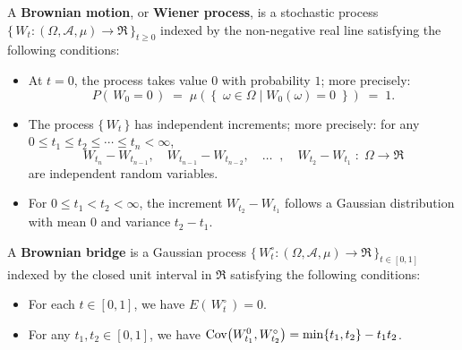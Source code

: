 \begin{definition}
\mbox{}\vskip 0.1cm
\noindent
A \textbf{Brownian motion}, or \textbf{Wiener process}, is a stochastic process
$\{\,W_{t} : \left(\Omega,\mathcal{A},\mu\right) \longrightarrow \Re\,\}_{t \geq 0}$ indexed by the non-negative real line
satisfying the following conditions:
\begin{itemize}
\item At $t = 0$, the process takes value $0$ with probability $1$; more precisely:
	\begin{equation*}
	P\!\left(\,W_{0} = 0\,\right)\; = \; \mu\!\left(\left\{\;\omega\in\Omega\;\vert\;W_{0}(\omega)=0\;\right\}\right) \; = \; 1.
	\end{equation*}
\item The process $\{\,W_{t}\,\}$ has independent increments; more precisely:
	for any $0 \leq t_{1} \leq t_{2} \leq \cdots \leq t_{n} < \infty$,
	\begin{equation*}
	W_{t_{n}} - W_{t_{n-1}}, 	\quad W_{t_{n-1}} - W_{t_{n-2}}, \quad \ldots \;\; , \quad W_{t_{2}} - W_{t_{1}}
	\; : \; \Omega \longrightarrow \Re
	\end{equation*}
	are independent random variables.
\item For $0 \leq t_{1} < t_{2} < \infty$, the increment $W_{t_{2}} - W_{t_{1}}$
	follows a Gaussian distribution with mean $0$ and variance $t_{2} - t_{1}$.
\end{itemize}
\end{definition}

\begin{definition}
\mbox{}\vskip 0.1cm
\noindent
A \textbf{Brownian bridge} is a Gaussian process
$\{\,W^{\circ}_{t} : \left(\Omega,\mathcal{A},\mu\right) \longrightarrow \Re\,\}_{t \in [0,1]}$
indexed by the closed unit interval in $\Re$ satisfying the following conditions:
\begin{itemize}
\item For each $t \in [0,1]$, we have $E\!\left(\,W^{\circ}_{t}\,\right) = 0$.
\item For any $t_{1}, t_{2} \in [0,1]$, we have $\textnormal{Cov}\!\left(W^{0}_{t_{1}},W^{\circ}_{t_{2}}\right) = \min\{t_{1},t_{2}\} - t_{1}t_{2}$.
\end{itemize}
\end{definition}

